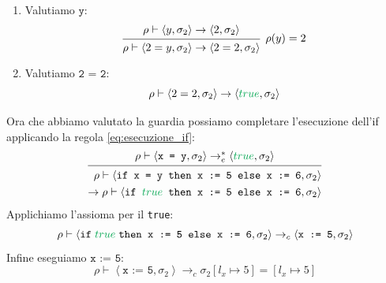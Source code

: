 \documentclass[a4paper]{article}
\begin{document}
\begin{example}
\begin{itemize}
\begin{itemize}
\begin{enumerate}
            \item Valutiamo \( \texttt{y} \):
              \[
                \begin{prooftree}
                  \hypo{ 
                    \rho \vdash \left< y, \sigma_2 \right> \to
                    \left< 2, \sigma_2 \right>
                  }
                  \infer1
                  [\( 
                    \rho(y) = 2
                  \)]
                  { 
                    \rho \vdash \left< 2 = y, \sigma_2  \right> \to
                    \left< 2 = 2, \sigma_2  \right>
                  }
                \end{prooftree}
              \]

            \item Valutiamo \( \texttt{2 = 2} \):
              \[
                \rho \vdash \left< 2 = 2, \sigma_2  \right> \to
                \left< \mathcolor{Green}{true}, \sigma_2  \right>
              \]
          \end{enumerate}
          Ora che abbiamo valutato la guardia possiamo completare l'esecuzione dell'if
          applicando la regola \ref{eq:esecuzione_if}:
          \[
            \begin{prooftree}
              \hypo{ 
                \rho \vdash \left< \texttt{x = y}, \sigma_2 \right>
                \to^*_e \left< \mathcolor{Green}{true}, \sigma_2 \right>
              }
              \infer1{ 
                \begin{aligned}
                  \rho \vdash \left<
                    \texttt{if x = y then x := 5 else x := 6},
                    \sigma_2
                  \right> \\
                  \to 
                  \rho \vdash \left<
                  \texttt{if \( \mathcolor{Green}{true} \) then x := 5 else x := 6},
                    \sigma_2
                  \right>
                \end{aligned}
              }
            \end{prooftree}
          \] 
          Applichiamo l'assioma per il \texttt{true}:
          \[
            \rho \vdash
            \left<
              \texttt{if\;\( \mathcolor{Green}{true} \)\;then x := 5 else x := 6},
              \sigma_2
            \right> \to_c
            \left< \texttt{x := 5}, \sigma_2  \right>
          \] 
          Infine eseguiamo \( \texttt{x := 5} \):
          \[
            \rho \vdash \left< \texttt{x := 5}, \sigma_2  \right> \to_c
            \sigma_2[l_x \mapsto 5] = \left[ l_x \mapsto 5 \right]
          \] 
      \end{itemize}
  \end{itemize}
\end{example}
\end{document}
